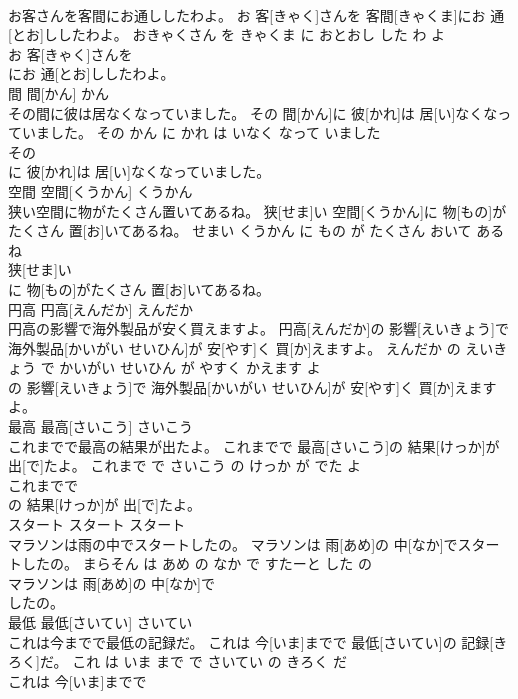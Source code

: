 \documentclass[8pt]{extreport}
\begin{document}
\begin{CJK}{UTF8}{min}
\\	お客さんを客間にお通ししたわよ。	お 客[きゃく]さんを 客間[きゃくま]にお 通[とお]ししたわよ。	おきゃくさん を きゃくま に おとおし した わ よ	
\\	お 客[きゃく]さんを
\\	にお 通[とお]ししたわよ。			
\\	間	間[かん]	かん	
\\	その間に彼は居なくなっていました。	その 間[かん]に 彼[かれ]は 居[い]なくなっていました。	その かん に かれ は いなく なって いました	
\\	その
\\	に 彼[かれ]は 居[い]なくなっていました。			
\\	空間	空間[くうかん]	くうかん	
\\	狭い空間に物がたくさん置いてあるね。	狭[せま]い 空間[くうかん]に 物[もの]がたくさん 置[お]いてあるね。	せまい くうかん に もの が たくさん おいて ある ね	
\\	狭[せま]い
\\	に 物[もの]がたくさん 置[お]いてあるね。			
\\	円高	円高[えんだか]	えんだか	
\\	円高の影響で海外製品が安く買えますよ。	円高[えんだか]の 影響[えいきょう]で 海外製品[かいがい せいひん]が 安[やす]く 買[か]えますよ。	えんだか の えいきょう で かいがい せいひん が やすく かえます よ	
\\	の 影響[えいきょう]で 海外製品[かいがい せいひん]が 安[やす]く 買[か]えますよ。			
\\	最高	最高[さいこう]	さいこう	
\\	これまでで最高の結果が出たよ。	これまでで 最高[さいこう]の 結果[けっか]が 出[で]たよ。	これまで で さいこう の けっか が でた よ	
\\	これまでで
\\	の 結果[けっか]が 出[で]たよ。			
\\	スタート	スタート	スタート	
\\	マラソンは雨の中でスタートしたの。	マラソンは 雨[あめ]の 中[なか]でスタートしたの。	まらそん は あめ の なか で すたーと した の	
\\	マラソンは 雨[あめ]の 中[なか]で
\\	したの。			
\\	最低	最低[さいてい]	さいてい	
\\	これは今までで最低の記録だ。	これは 今[いま]までで 最低[さいてい]の 記録[きろく]だ。	これ は いま まで で さいてい の きろく だ	
\\	これは 今[いま]までで

\end{CJK}
\end{document}
